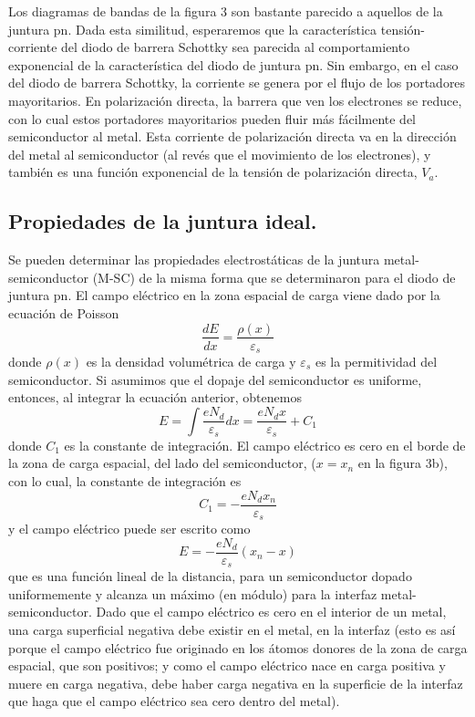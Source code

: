 \documentclass[12pt,a4paper]{article}
\begin{document}
Los diagramas de bandas de la figura 3 son bastante parecido a aquellos de la juntura pn. Dada esta similitud, esperaremos que la característica tensión-corriente del diodo de barrera Schottky sea parecida al comportamiento exponencial de la característica del diodo de juntura pn. Sin embargo, en el caso del diodo de barrera Schottky, la corriente se genera por el flujo de los portadores mayoritarios. En polarización directa, la barrera que ven los electrones se reduce, con lo cual estos portadores mayoritarios pueden fluir más fácilmente del semiconductor al metal. Esta corriente de polarización directa va en la dirección del metal al semiconductor (al revés que el movimiento de los electrones), y también es una función exponencial de la tensión de polarización directa, $V_{a}$.

\subsection{Propiedades de la juntura ideal.}

Se pueden determinar las propiedades electrostáticas de la juntura metal-semiconductor (M-SC) de la misma forma que se determinaron para el diodo de juntura pn. El campo eléctrico en la zona espacial de carga viene dado por la ecuación de Poisson
\[ \frac{dE}{dx}=\frac{\rho (x)}{\varepsilon _{s}} \]
donde $\rho (x)$ es la densidad volumétrica de carga y $\varepsilon _{s}$ es la permitividad del semiconductor. Si asumimos que el dopaje del semiconductor es uniforme, entonces, al integrar la ecuación anterior, obtenemos
\[ E= \int \frac{eN_{d}}{\varepsilon _{s}}dx=\frac{eN_{d}x}{\varepsilon _{s}}+C_{1} \]
donde $C_{1}$ es la constante de integración. El campo eléctrico es cero en el borde de la zona de carga espacial, del lado del semiconductor, ($x=x_{n}$ en la figura 3b), con lo cual, la constante de integración es
\[ C_{1}=-\frac{eN_{d}x_{n}}{\varepsilon _{s}} \]
y el campo eléctrico puede ser escrito como
\[ E=-\frac{eN_{d}}{\varepsilon _{s}} (x_{n}-x) \]
que es una función lineal de la distancia, para un semiconductor dopado uniformemente y alcanza un máximo (en módulo) para la interfaz metal-semiconductor. Dado que el campo eléctrico es cero en el interior de un metal, una carga superficial negativa debe existir en el metal, en la interfaz (esto es así porque el campo eléctrico fue originado en los átomos donores de la zona de carga espacial, que son positivos; y como el campo eléctrico nace en carga positiva y muere en carga negativa, debe haber carga negativa en la superficie de la interfaz que haga que el campo eléctrico sea cero dentro del metal).
\end{document}
